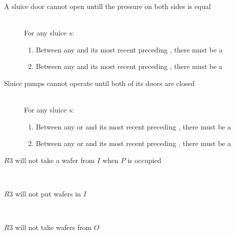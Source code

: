\begin{description}
 
 
 \item[A sluice door cannot open untill the pressure on both sides is equal] \hfill \\
 For any sluice $s$:
 \begin{enumerate}
  \item Between any  and its most recent preceding , there must be a 
  \item Between any  and its most recent preceding , there must be a 
 \end{enumerate}

 \item[Sluice pumps cannot operate until both of its doors are closed] \hfill \\
 For any sluice $s$:
 \begin{enumerate}
  \item Between any  or  and its most recent preceding , there must be a 
  \item Between any  or  and its most recent preceding , there must be a 
 \end{enumerate}

 \item[$R3$ will not take a wafer from $I$ when $P$ is occupied] \hfill \\
 
 \item[$R3$ will not put wafers in $I$] \hfill \\
 
 \item[$R3$ will not take wafers from $O$] \hfill \\
 
\end{description}
